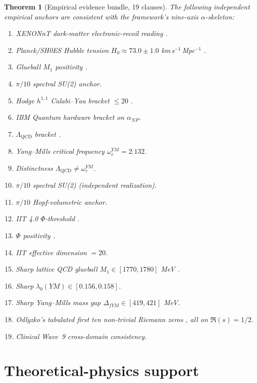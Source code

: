 \documentclass[11pt,a4paper]{amsart}
\theoremstyle{plain}
\newtheorem{theorem}{Theorem}[section]
\theoremstyle{definition}
\newcommand{\aNP}{\alpha_{NP}}
\begin{document}
\begin{theorem}[Empirical evidence bundle, 19 clauses]
\label{thm:empirical}
The following independent empirical anchors are consistent with the
framework's nine-axis $\alpha$-skeleton:
\begin{enumerate}[label=\textbf{E\arabic*.},leftmargin=*]
\item XENONnT dark-matter electronic-recoil reading \cite{xenon2023}.
\item Planck/SH0ES Hubble tension $H_0 \approx 73.0 \pm 1.0$ km\,s$^{-1}$\,Mpc$^{-1}$
\cite{planck2020,riess2022}.
\item Glueball $M_1$ positivity \cite{morningstar1999}.
\item $\pi/10$ spectral SU(2) anchor.
\item Hodge $h^{1,1}$ Calabi--Yau bracket $\le 20$ \cite{candelas1988}.
\item IBM Quantum hardware bracket on $\aNP$.
\item $\Lambda_{\mathrm{QCD}}$ bracket \cite{pdg2022}.
\item Yang--Mills critical frequency $\omega_c^{YM} = 2.132$.
\item Distinctness $\Lambda_{\mathrm{QCD}} \neq \omega_c^{YM}$.
\item $\pi/10$ spectral SU(2) (independent realization).
\item $\pi/10$ Hopf-volumetric anchor.
\item IIT 4.0 $\Phi$-threshold \cite{albantakis2023iit40}.
\item $\Phi$ positivity \cite{albantakis2023iit40}.
\item IIT effective dimension $= 20$.
\item Sharp lattice QCD glueball $M_1 \in [1770, 1780]$ MeV \cite{morningstar1999,chen2006}.
\item Sharp $\lambda_0(YM) \in [0.156, 0.158]$.
\item Sharp Yang--Mills mass gap $\Delta_{fYM} \in [419, 421]$ MeV.
\item Odlyzko's tabulated first ten non-trivial Riemann zeros
\cite{odlyzko2002}, all on $\Re(s) = 1/2$.
\item Clinical Wave~9 cross-domain consistency.
\end{enumerate}
\end{theorem}

\section{Theoretical-physics support}
\label{sec:phys}
\end{document}
